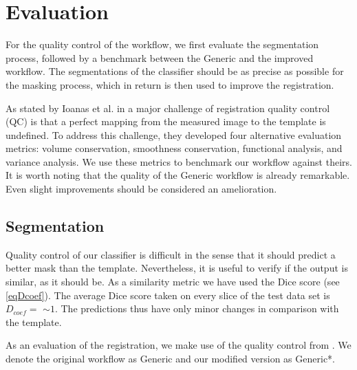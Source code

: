 \section{Evaluation}
For the quality control of the workflow, we first evaluate the segmentation process, followed by a benchmark between the Generic and the improved workflow.
The segmentations of the classifier should be as precise as possible for the masking process, which in return is then used to improve the registration.

As stated by Ioanas et al. in \cite{ioanas_optimized_2019} a major challenge of registration quality control (QC) is that a perfect mapping from the measured image to the template is undefined.
To address this challenge, they developed four alternative evaluation metrics: volume conservation, smoothness conservation, functional analysis, and variance analysis.
We use these metrics to benchmark our workflow against theirs.
It is worth noting that the quality of the Generic workflow is already remarkable.
Even slight improvements should be considered an amelioration.

\subsection{Segmentation}
Quality control of our classifier is difficult in the sense that it should predict a better mask than the template.
Nevertheless, it is useful to verify if the output is similar, as it should be.
As a similarity metric we have used the Dice score (see \cref{eqDcoef}).
The average Dice score taken on every slice of the test data set is $D_{coef}= $  $\sim 1$.
The predictions thus have only minor changes in comparison with the template.


\begin{sansmath}
\end{sansmath}

As an evaluation of the registration, we make use of the quality control from \cite{ioanas_optimized_2019}.
We denote the original workflow as Generic and our modified version as Generic*.

